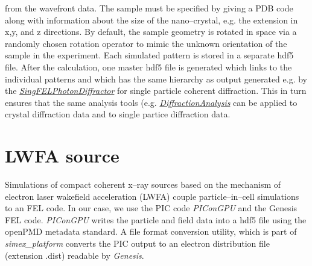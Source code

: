\documentclass[12pt]{scrartcl}
\begin{document}
from the wavefront data. The sample must be specified by giving a PDB code along
with information about the size of the nano--crystal, e.g. the extension in x,y,
and z directions. By default, the sample geometry is rotated in space via a
randomly chosen rotation operator to mimic the unknown orientation of the sample
in the experiment. Each simulated pattern is stored in a separate hdf5 file.
After the calculation, one master hdf5 file is generated which links to the
individual patterns and which has the same hierarchy as output generated e.g. by
the
\href{https://eucall-software.github.io/simex_platform/#SimEx.Calculators.SingFELPhotonDiffractor.SingFELPhotonDiffractor}{\textit{SingFELPhotonDiffractor}}
for single particle coherent diffraction. This in turn ensures that the same
analysis tools (e.g.
\href{https://eucall-software.github.io/simex_platform/#SimEx.Analysis.DiffractionAnalysis.DiffractionAnalysis}{\textit{DiffractionAnalysis}}
can be applied to crystal diffraction data and to single partice diffraction
data.

%
\section{LWFA source}\label{sec:lwfa_source}
Simulations of compact coherent x--ray sources based on the mechanism of
electron laser wakefield acceleration (LWFA) couple particle--in--cell
simulations to an FEL code. In our case, we use the PIC code \textit{PIConGPU}
and the Genesis FEL code. \textit{PIConGPU} writes the particle and field data
into a hdf5 file using the openPMD \cite{Huebl2017} metadata standard. A file format conversion utility, which is part of
\textit{simex\_platform} converts the PIC output to an electron distribution
file (extension .dist) readable by \textit{Genesis}.

\printbibliography[notkeyword=report, notkeyword=zenodo, title={Journal articles}]
%
\printbibliography[keyword=eucall, keyword=report, title={EUCALL Reports}]
%
\printbibliography[keyword=zenodo, title={EUCALL Data Repository Depositions}]
\end{document}

